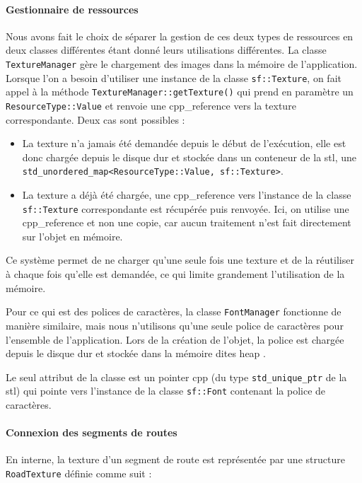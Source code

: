 \paragraph{Gestionnaire de ressources}
Nous avons fait le choix de séparer la gestion de ces deux types de ressources en deux classes différentes étant donné leurs utilisations différentes.
La classe \texttt{TextureManager} gère le chargement des images dans la mémoire de l'application.
Lorsque l'on a besoin d'utiliser une instance de la classe \texttt{sf::Texture}\cite{sfml_sf_texture}, on fait appel à la méthode \texttt{TextureManager::getTexture()} qui prend en paramètre un \texttt{ResourceType::Value} et renvoie une \gls{cpp_reference} vers la texture correspondante.
Deux cas sont possibles :
\begin{itemize}
    \item La texture n'a jamais été demandée depuis le début de l'exécution, elle est donc chargée depuis le disque dur et stockée dans un conteneur de la \gls{stl}, une \texttt{\gls{std_unordered_map}<ResourceType::Value, sf::Texture>}\cite{cpp_reference_std_unordered_map}.
    \item La texture a déjà été chargée, une \gls{cpp_reference} vers l'instance de la classe \texttt{sf::Texture}\cite{sfml_sf_texture} correspondante est récupérée puis renvoyée.
    Ici, on utilise une \gls{cpp_reference} et non une copie, car aucun traitement n'est fait directement sur l'objet en mémoire.
\end{itemize}
Ce système permet de ne charger qu'une seule fois une texture et de la réutiliser à chaque fois qu'elle est demandée, ce qui limite grandement l'utilisation de la mémoire.

Pour ce qui est des polices de caractères, la classe \texttt{FontManager} fonctionne de manière similaire, mais nous n'utilisons qu'une seule police de caractères pour l'ensemble de l'application.
Lors de la création de l'objet, la police est chargée depuis le disque dur et stockée dans la mémoire dites \og \gls{heap} \fg{}.

Le seul attribut de la classe est un \gls{pointer} \gls{cpp} (du type \texttt{\gls{std_unique_ptr}}\cite{cpp_reference_std_unique_ptr} de la \gls{stl}) qui pointe vers l'instance de la classe \texttt{sf::Font} contenant la police de caractères.

\paragraph{Connexion des segments de routes}
En interne, la texture d'un segment de route est représentée par une structure \texttt{RoadTexture} définie comme suit :

